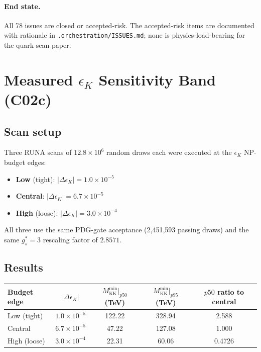 \documentclass[11pt]{article}
\newcommand{\Mkk}{M_{\mathrm{KK}}}
\newcommand{\gs}{g_s^*}
\newcommand{\eK}{\epsilon_K}
\newcommand{\DeK}{\Delta\eK}
\begin{document}
\paragraph{End state.}
All 78 issues are closed or accepted-risk.  The accepted-risk items
are documented with rationale in
\texttt{.orchestration/ISSUES.md}; none is physics-load-bearing for
the quark-scan paper.


\section{Measured $\eK$ Sensitivity Band (C02c)}
\label{sec:c02c}

\subsection{Scan setup}

Three RUNA scans of $12.8\times10^6$ random draws each were executed
at the $\eK$ NP-budget edges:
\begin{itemize}[nosep]
  \item \textbf{Low} (tight): $|\DeK| = 1.0\times10^{-5}$
  \item \textbf{Central}: $|\DeK| = 6.7\times10^{-5}$
  \item \textbf{High} (loose): $|\DeK| = 3.0\times10^{-4}$
\end{itemize}
All three use the same PDG-gate acceptance (2,451,593 passing draws)
and the same $\gs = 3$ rescaling factor of $2.8571$.

\subsection{Results}

\begin{center}
\begin{tabular}{@{}lcccc@{}}
\toprule
Budget edge & $|\DeK|$ &
  $\Mkk^{\min}|_{p50}$ (TeV) &
  $\Mkk^{\min}|_{p95}$ (TeV) &
  $p50$ ratio to central \\
\midrule
Low (tight) & $1.0\times10^{-5}$ &
  122.22 & 328.94 & 2.588 \\
Central & $6.7\times10^{-5}$ &
  47.22 & 127.08 & 1.000 \\
High (loose) & $3.0\times10^{-4}$ &
  22.31 & 60.06 & 0.4726 \\
\bottomrule
\end{tabular}
\end{center}
\end{document}
